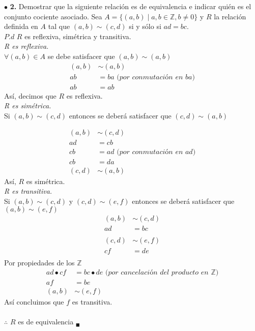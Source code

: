 \documentclass[12pt]{article}
\begin{document}
\vspace{0.5cm}
%
%
$\bullet$ \textbf{2.} Demostrar que la siguiente relación es de equivalencia e indicar quién es el conjunto cociente asociado. 
Sea $A = \{(a, b) \mid a, b \in \mathbb{Z}, b \neq 0\}$ y $R$ la relación definida en $A$ tal que $(a, b) \sim (c, d)$ si y sólo si $ad = bc$.\\

$P.d$ $R$ es reflexiva, simétrica y transitiva.\\

\textit{R es reflexiva.}\\

$\forall (a, b) \in A$ se debe satisfacer que $(a, b) \sim (a, b)$
\begin{align*}
    (a, b) &\sim (a, b)\\
    ab &= ba \textit{ (por conmutación en ba)}\\
    ab &= ab
\end{align*}
Así, decimos que $R$ es reflexiva.\\

\textit{R es simétrica.}\\

Si $(a, b) \sim (c, d)$ entonces se deberá satisfacer que $(c, d) \sim (a, b)$

\begin{align*}
    (a, b) &\sim (c, d)\\
    ad &= cb \\
    cb &= ad \textit{ (por conmutación en ad)}\\ 
    cb &= da\\
    (c, d) &\sim (a, b)
\end{align*}
Así, $R$ es simétrica.\\

\textit{R es transitiva.}\\

Si $(a, b) \sim (c, d)$ y $(c, d) \sim (e, f)$ entonces se deberá satisfacer que $(a, b) \sim (e, f)$
\begin{align*}
    (a, b) &\sim (c, d)\\
    ad &= bc\\
    \\
    (c, d) &\sim (e, f)\\
    cf &= de\\
\end{align*}
Por propiedades de los $\mathbb{Z}$
\begin{align*}
    ad \bullet cf &= bc \bullet de \textit{ (por cancelación del producto en $\mathbb{Z}$)}\\
    af &= be\\
    (a, b) &\sim (e, f)
\end{align*}
Así concluimos que $f$ es transitiva.\\
\\
$\therefore$ $R$ es de equivalencia $_\blacksquare$\\
\end{document}
